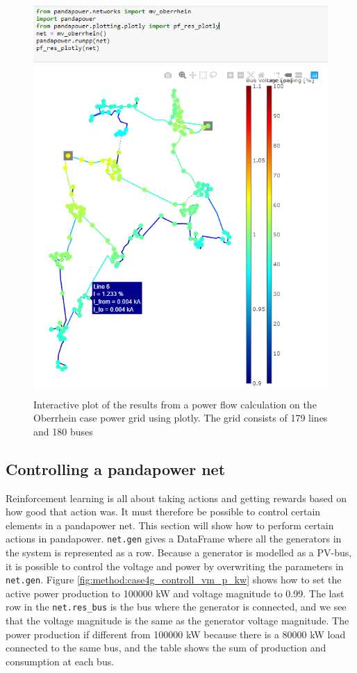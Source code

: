 \documentclass[class=book, crop=false]{standalone}
\begin{document}
\begin{figure}[H]
    \center
    \includegraphics[height=15cm, width=12cm]{figures/results_pp_oberrhein.png}
    \caption[size = 9]{Interactive plot of the results from a power flow calculation on the Oberrhein case power grid using plotly. The grid consists of 179 lines and 180 buses}
    \label{fig:method:oberrhein_grid_results_plotly}
\end{figure}


\subsection{Controlling a pandapower net}
Reinforcement learning is all about taking actions and getting rewards based on how good that action was. It must therefore be possible to control certain elements in a pandapower net. This section will show how to perform certain actions in pandapower. \texttt{net.gen} gives a DataFrame where all the generators in the system is represented as a row. Because a generator is modelled as a PV-bus, it is possible to control the voltage and power by overwriting the parameters in \texttt{net.gen}. Figure \ref{fig:method:case4g_controll_vm_p_kw} shows how to set the active power production to 100000 kW and voltage magnitude to 0.99. The last row in the \texttt{net.res\_bus} is the bus where the generator is connected, and we see that the voltage magnitude is the same as the generator voltage magnitude. The power production if different from 100000 kW because there is a 80000 kW load connected to the same bus, and the table shows the sum of production and consumption at each bus. 
\end{document}
